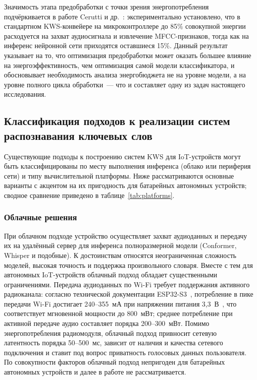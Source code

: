 Значимость этапа предобработки с точки зрения энергопотребления
подчёркивается в работе Cerutti и др.~\cite{src:7}: экспериментально
установлено, что в стандартном KWS-конвейере на микроконтроллере до 85\%
совокупной энергии расходуется на захват аудиосигнала и извлечение
MFCC-признаков, тогда как на инференс нейронной сети приходятся
оставшиеся 15\%. Данный результат указывает на то, что оптимизация
предобработки может оказать большее влияние на энергоэффективность, чем
оптимизация самой модели классификатора, и обосновывает необходимость
анализа энергобюджета не на уровне модели, а на уровне полного цикла
обработки~--- что и составляет одну из задач настоящего исследования.

\subsection{Классификация подходов к реализации систем распознавания ключевых слов}

Существующие подходы к построению систем KWS для IoT-устройств могут быть
классифицированы по месту выполнения инференса (облако или периферия
сети) и типу вычислительной платформы. Ниже рассматриваются основные
варианты с акцентом на их пригодность для батарейных автономных
устройств; сводное сравнение приведено в таблице~\ref{tab:platforms}.

\subsubsection{Облачные решения}

При облачном подходе устройство осуществляет захват аудиоданных и
передачу их на удалённый сервер для инференса полноразмерной модели
(Conformer, Whisper и подобные). К достоинствам относятся неограниченная
сложность моделей, высокая точность и поддержка произвольного словаря.
Вместе с тем для автономных IoT-устройств облачный подход обладает
существенными ограничениями. Передача аудиоданных по Wi-Fi требует
поддержания активного радиоканала: согласно технической документации
ESP32-S3~\cite{src:9}, потребление в пике передачи Wi-Fi достигает
240--355~мА при напряжении питания 3,3~В~\cite{src:9}, что соответствует
мгновенной мощности до 800~мВт; среднее потребление при активной передаче
аудио составляет порядка 200--300~мВт. Помимо
энергопотребления радиомодуля, облачный подход привносит сетевую
латентность порядка 50--500~мс, зависит от наличия и качества сетевого
подключения и ставит под вопрос приватность голосовых данных
пользователя. По совокупности факторов облачный подход непригоден для
батарейных автономных устройств и далее в работе не рассматривается.

